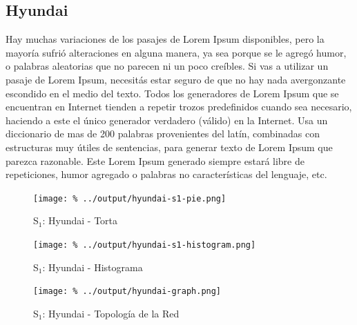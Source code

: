 \documentclass[final,inline,a4paper,narroweqnarray]{ieee}
\begin{document}
  \subsection{Hyundai}

Hay muchas variaciones de los pasajes de Lorem Ipsum disponibles, pero la mayoría sufrió alteraciones en alguna manera, ya sea porque se le agregó humor, o palabras aleatorias que no parecen ni un poco creíbles. Si vas a utilizar un pasaje de Lorem Ipsum, necesitás estar seguro de que no hay nada avergonzante escondido en el medio del texto. Todos los generadores de Lorem Ipsum que se encuentran en Internet tienden a repetir trozos predefinidos cuando sea necesario, haciendo a este el único generador verdadero (válido) en la Internet. Usa un diccionario de mas de 200 palabras provenientes del latín, combinadas con estructuras muy útiles de sentencias, para generar texto de Lorem Ipsum que parezca razonable. Este Lorem Ipsum generado siempre estará libre de repeticiones, humor agregado o palabras no características del lenguaje, etc.

    \begin{figure}[ht]\begin{center}
      \texttt{[image: \%
      ../output/hyundai-s1-pie.png]}
      \vspace{-2em}
      \caption{S$_1$: Hyundai - Torta}
      \label{hyundai-s1-pie}
    \end{center}\end{figure}

    \begin{figure}[H]\begin{center}
      \texttt{[image: \%
      ../output/hyundai-s1-histogram.png]}
      \vspace{-2em}
      \caption{S$_1$: Hyundai - Histograma}
      \label{hyundai-s1-histogram}
    \end{center}\end{figure}

    \begin{figure}[ht]\begin{center}
      \texttt{[image: \%
      ../output/hyundai-graph.png]}
      \vspace{-2em}
      \caption{S$_1$: Hyundai - Topología de la Red}
      \label{hyundai-graph}
    \end{center}\end{figure}
\end{document}
